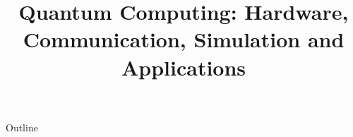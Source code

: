 \documentclass[xcolor=dvipsnames,compress,t,pdf,9pt]{beamer}
\title[\insertframenumber /\inserttotalframenumber]{Quantum Computing: Hardware, Communication, Simulation and Applications}
\begin{document}
	\begin{frame}
	\titlepage
	\end{frame}

	\begin{frame}{Outline}
	    \tableofcontents
	\end{frame}

	
	
	
	
\end{document}
